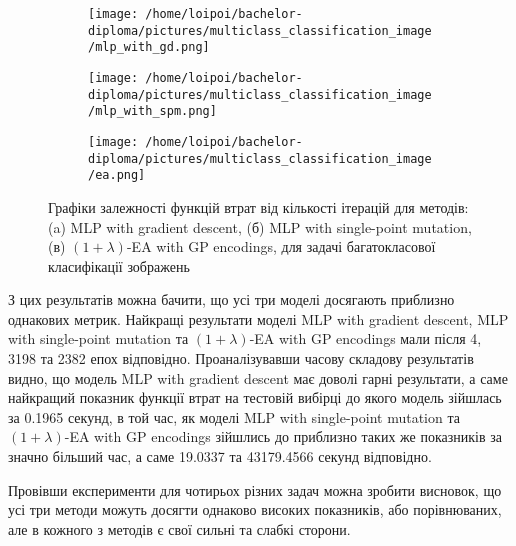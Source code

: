 \begin{figure}[ht]
	\centering
	\begin{subfigure}[b]{0.32\textwidth}    
		\texttt{[image: /home/loipoi/bachelor-diploma/pictures/multiclass\_classification\_image/mlp\_with\_gd.png]}
		\caption{}
	\end{subfigure}	
	\begin{subfigure}[b]{0.32\textwidth}
		\texttt{[image: /home/loipoi/bachelor-diploma/pictures/multiclass\_classification\_image/mlp\_with\_spm.png]}
		\caption{}
	\end{subfigure}	
	\begin{subfigure}[b]{0.32\textwidth}
		\texttt{[image: /home/loipoi/bachelor-diploma/pictures/multiclass\_classification\_image/ea.png]}
		\caption{}
	\end{subfigure}
	
	\caption{Графіки залежності функцій втрат від кількості ітерацій для методів: (a) MLP with gradient descent, (б) MLP with single-point mutation, (в) $(1+\lambda)$-EA with GP encodings, для задачі багатокласової класифікації зображень}
	\label{fig_losses_mc_id}
\end{figure}

З цих результатів можна бачити, що усі три моделі досягають приблизно однакових метрик. Найкращі результати моделі MLP with gradient descent, MLP with single-point mutation та $(1+\lambda)$-EA with GP encodings мали після 4, 3198 та 2382 епох відповідно. Проаналізувавши часову складову результатів видно, що модель MLP with gradient descent має доволі гарні результати, а саме найкращий показник функції втрат на тестовій вибірці до якого модель зійшлась за 0.1965 секунд, в той час, як моделі MLP with single-point mutation та $(1+\lambda)$-EA with GP encodings зійшлись до приблизно таких же показників за значно більший час, а саме 19.0337 та 43179.4566 секунд відповідно.

Провівши експерименти для чотирьох різних задач можна зробити висновок, що усі три методи можуть досягти однаково високих показників, або порівнюваних, але в кожного з методів є свої сильні та слабкі сторони. 

